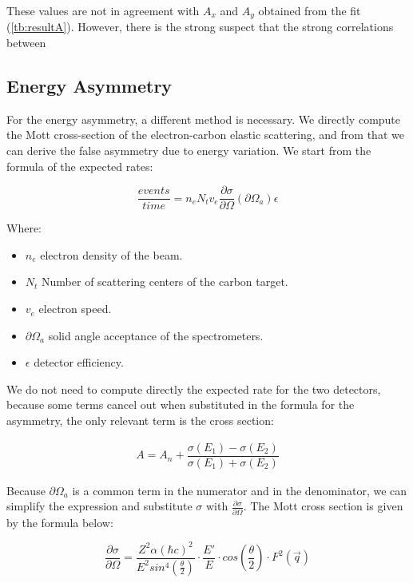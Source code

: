 These values are not in agreement with $A_{x}$ and $A_{y}$ obtained from the fit (\ref{tb:resultA}). However, there is the strong suspect that the strong correlations between

\subsection{Energy Asymmetry}

For the energy asymmetry, a different method is necessary. We directly compute the Mott cross-section of the electron-carbon elastic scattering, and from that we can derive the false asymmetry due to energy variation.
We start from the formula of the expected rates:

\begin{equation}
\frac{events}{time} = n_{e} N_{t} v_{e} \frac{\partial \sigma}{\partial \Omega} (\partial \Omega_{a}) \epsilon 
\end{equation} 

Where:
\begin{itemize}
\item $n_{e}$ electron density of the beam.
\item $N_t$ Number of scattering centers of the carbon target.
\item $v_{e}$ electron speed.
\item $\partial \Omega_{a}$ solid angle acceptance of the spectrometers.
\item $\epsilon$ detector efficiency.
\end{itemize}

We do not need to compute directly the expected rate for the two detectors, because some terms cancel out when substituted in the formula for the asymmetry, the only relevant term is the cross section:

\begin{align*}
A = A_{n} + \dfrac{\sigma(E_{1}) - \sigma(E_{2})}{\sigma(E_{1}) + \sigma(E_{2})}
\end{align*}

Because $\partial \Omega_{a}$ is a common term in the numerator and in the denominator, we can simplify the expression and substitute $\sigma $ with $ \frac{\partial \sigma}{ \partial \Omega}$.
The Mott cross section is given by the formula below:

\begin{equation} \label{eq:Mott}
\dfrac{\partial \sigma}{\partial \Omega} = \dfrac{Z^{2} \alpha (\hbar c)^2}{E^{2} sin^{4}(\frac{\theta}{2})} \cdot \frac{E'}{E} \cdot  cos(\frac{\theta}{2}) \cdot F^{2}(\vec{q}) 
\end{equation}

